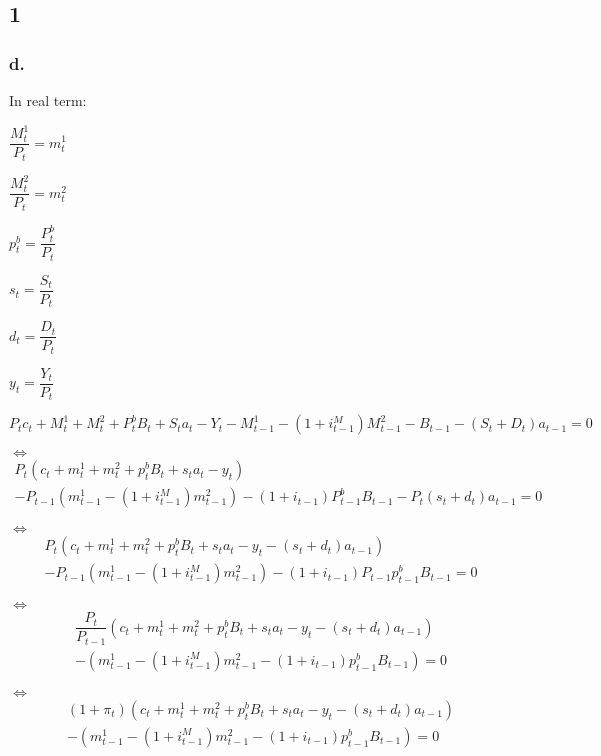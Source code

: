 \documentclass{article}
\begin{document}
\subsection*{1} 

\subsubsection*{d.} 

In real term:

$\dfrac{M^{1}_{t}}{P_{t}}=m^{1}_{t}$

$\dfrac{M^{2}_{t}}{P_{t}}=m^{2}_{t}$

$p^{b}_{t}=\dfrac{P^{b}_{t}}{P_{t}}$

$s_{t}=\dfrac{S_{t}}{P_{t}}$

$d_{t}=\dfrac{D_{t}}{P_{t}}$

$y_{t}=\dfrac{Y_{t}}{P_{t}}$

$P_{t}c_{t}+M^{1}_{t}+M^{2}_{t}+P^{b}_{t}B_{t}+S_{t}a_{t}-Y_{t}-M^{1}_{t-1}-\left(1+i^{M}_{t-1}\right)M^{2}_{t-1}-B_{t-1}-\left(S_{t}+D_{t}\right)a_{t-1}=0$

$\iff$
\begin{multline*}
    P_{t}\left(c_{t}+m^{1}_{t}+m^{2}_{t}+p^{b}_{t}B_{t}+s_{t}a_{t}-y_{t}\right)\\
    -P_{t-1}\left(m^{1}_{t-1}-\left(1+i^{M}_{t-1}\right)m^{2}_{t-1}\right)-\left(1+i_{t-1}\right)P^{b}_{t-1}B_{t-1}-P_{t}\left(s_{t}+d_{t}\right)a_{t-1}=0
\end{multline*}

$\iff$
\begin{multline*}
    P_{t}\left(c_{t}+m^{1}_{t}+m^{2}_{t}+p^{b}_{t}B_{t}+s_{t}a_{t}-y_{t}-\left(s_{t}+d_{t}\right)a_{t-1}\right)\\
    -P_{t-1}\left(m^{1}_{t-1}-\left(1+i^{M}_{t-1}\right)m^{2}_{t-1}\right)-\left(1+i_{t-1}\right)P_{t-1}p^{b}_{t-1}B_{t-1}=0
\end{multline*}

$\iff$
\begin{multline*}
    \dfrac{P_{t}}{P_{t-1}}\left(c_{t}+m^{1}_{t}+m^{2}_{t}+p^{b}_{t}B_{t}+s_{t}a_{t}-y_{t}-\left(s_{t}+d_{t}\right)a_{t-1}\right)\\
    -\left(m^{1}_{t-1}-\left(1+i^{M}_{t-1}\right)m^{2}_{t-1}-\left(1+i_{t-1}\right)p^{b}_{t-1}B_{t-1}\right)=0
\end{multline*}

$\iff$
\begin{multline*}
    \left(1+\pi_{t}\right)\left(c_{t}+m^{1}_{t}+m^{2}_{t}+p^{b}_{t}B_{t}+s_{t}a_{t}-y_{t}-\left(s_{t}+d_{t}\right)a_{t-1}\right)\\
    -\left(m^{1}_{t-1}-\left(1+i^{M}_{t-1}\right)m^{2}_{t-1}-\left(1+i_{t-1}\right)p^{b}_{t-1}B_{t-1}\right)=0
\end{multline*}
\end{document}
